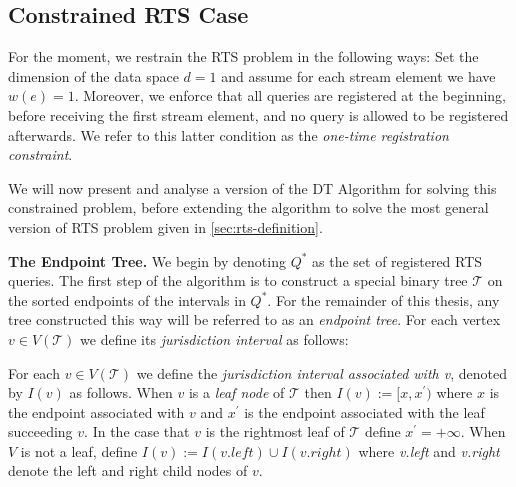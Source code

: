 \subsection{Constrained RTS Case}
\label{ssec:constrained-DT-algorithm}

For the moment, we restrain the RTS problem in the following ways: Set the dimension of the data space $d = 1$ and assume for each stream element we have $w(e) =1$. Moreover, we enforce that all queries are registered at the beginning, before receiving the first stream element, and no query is allowed to be registered afterwards. We refer to this latter condition as the \textit{one-time registration constraint}.

We will now present and analyse a version of the DT Algorithm for solving this constrained problem, before extending the algorithm to solve the most general version of RTS problem given in \cref{sec:rts-definition}.

\textbf{The Endpoint Tree.} We begin by denoting $Q^*$ as the set of registered RTS queries. The first step of the algorithm is to construct a special binary tree $\mathcal{T}$ on the sorted endpoints of the intervals in $Q^*$. For the remainder of this thesis, any tree constructed this way will be referred to as an \textit{endpoint tree}. For each vertex $v\in V(\mathcal{T})$ we define its \textit{jurisdiction interval} as follows: 

\begin{definition}
    For each $v\in V(\mathcal{T})$ we define the \textit{jurisdiction interval associated with v}, denoted by $I(v)$ as follows. When $v$ is a \textit{leaf node} of $\mathcal{T}$ then $I(v) := [x, x^\prime)$ where $x$ is the endpoint associated with $v$ and $x^\prime$ is the endpoint associated with the leaf succeeding $v$. In the case that $v$ is the rightmost leaf of $\mathcal{T}$ define $x^\prime = +\infty$. When $V$ is not a leaf, define $I(v) := I(v.left) \cup I(v.right)$ where \textit{v.left} and \textit{v.right} denote the left and right child nodes of $v$.
\end{definition} 

